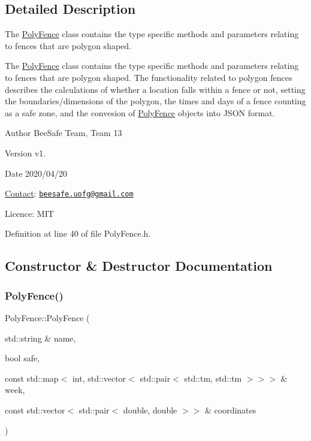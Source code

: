 \subsection{Detailed Description}
The \hyperlink{class_poly_fence}{Poly\+Fence} class contains the type specific methods and parameters relating to fences that are polygon shaped. 

The \hyperlink{class_poly_fence}{Poly\+Fence} class contains the type specific methods and parameters relating to fences that are polygon shaped. The functionality related to polygon fences describes the calculations of whether a location falls within a fence or not, setting the boundaries/dimensions of the polygon, the times and days of a fence counting as a safe zone, and the convesion of \hyperlink{class_poly_fence}{Poly\+Fence} objects into J\+S\+ON format.

\begin{DoxyAuthor}{Author}
Bee\+Safe Team, Team 13
\end{DoxyAuthor}
\begin{DoxyVersion}{Version}
v1.
\end{DoxyVersion}
\begin{DoxyDate}{Date}
2020/04/20
\end{DoxyDate}
\hyperlink{class_contact}{Contact}\+: \href{mailto:beesafe.uofg@gmail.com}{\tt beesafe.\+uofg@gmail.\+com}

Licence\+: M\+IT 

Definition at line 40 of file Poly\+Fence.\+h.



\subsection{Constructor \& Destructor Documentation}
\mbox{\label{class_poly_fence_a651e57a18ef757b31b5f6b54f7e081b9}} 
\subsubsection{\texorpdfstring{Poly\+Fence()}{PolyFence()}\hspace{0.1cm}{\footnotesize\ttfamily [1/3]}}
{\footnotesize\ttfamily Poly\+Fence\+::\+Poly\+Fence (\begin{DoxyParamCaption}\item[{std\+::string \&}]{name,  }\item[{bool}]{safe,  }\item[{const std\+::map$<$ int, std\+::vector$<$ std\+::pair$<$ std\+::tm, std\+::tm $>$$>$$>$ \&}]{week,  }\item[{const std\+::vector$<$ std\+::pair$<$ double, double $>$$>$ \&}]{coordinates }\end{DoxyParamCaption})}



